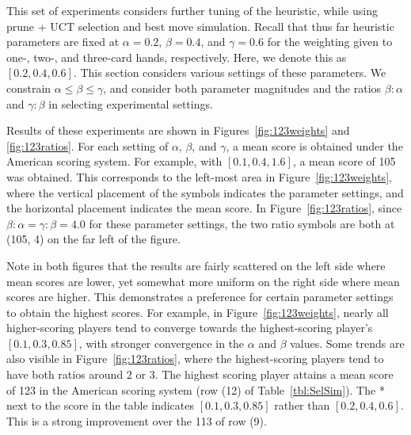\documentclass[letterpaper]{article}
\begin{document}
This set of experiments considers further tuning of the heuristic, while using prune + UCT selection and best move simulation. Recall that thus far heuristic parameters are fixed at $\alpha = 0.2$, $\beta = 0.4$, and $\gamma = 0.6$ for the weighting given to one-, two-, and three-card hands, respectively. Here, we denote this as $[0.2, 0.4, 0.6]$. This section considers various settings of these parameters. We constrain $\alpha \leq \beta \leq \gamma$, and consider both parameter magnitudes and the ratios $\beta : \alpha$ and $\gamma : \beta$ in selecting experimental settings.


Results of these experiments are shown in Figures~\ref{fig:123weights} and \ref{fig:123ratios}. For each setting of $\alpha$, $\beta$, and $\gamma$, a mean score is obtained under the American scoring system. For example, with $[0.1, 0.4, 1.6]$, a mean score of 105 was obtained. This corresponds to the left-most area in Figure~\ref{fig:123weights}, where the vertical placement of the symbols indicates the parameter settings, and the horizontal placement indicates the mean score. In Figure~\ref{fig:123ratios}, since $\beta:\alpha = \gamma:\beta = 4.0$ for these parameter settings, the two ratio symbols are both at (105, 4) on the far left of the figure.

Note in both figures that the results are fairly scattered on the left side where mean scores are lower, yet somewhat more uniform on the right side where mean scores are higher. This demonstrates a preference for certain parameter settings to obtain the highest scores. For example, in Figure~\ref{fig:123weights}, nearly all higher-scoring players tend to converge towards the highest-scoring player's $[0.1, 0.3, 0.85]$, with stronger convergence in the $\alpha$ and $\beta$ values. Some trends are also visible in Figure~\ref{fig:123ratios}, where the highest-scoring players tend to have both ratios around 2 or 3. The highest scoring player attains a mean score of 123 in the American scoring system (row (12) of Table~\ref{tbl:SelSim}). The \mbox{*} next to the score in the table indicates $[0.1, 0.3, 0.85]$ rather than $[0.2, 0.4, 0.6]$. This is a strong improvement over the 113 of row (9).
\end{document}
